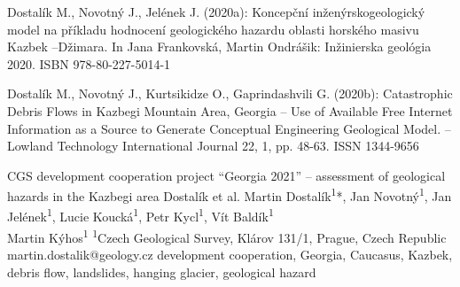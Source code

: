 {Dostalík M., Novotný J., Jelének J. (2020a): Koncepční inženýrskogeologický model na příkladu hodnocení geologického hazardu oblasti horského masivu Kazbek –Džimara. In Jana Frankovská, Martin Ondrášik: Inžinierska geológia 2020. ISBN 978-80-227-5014-1

Dostalík M., Novotný J., Kurtsikidze O., Gaprindashvili G. (2020b): Catastrophic Debris Flows in Kazbegi Mountain Area, Georgia – Use of Available Free Internet Information as a Source to Generate Conceptual Engineering Geological Model. – Lowland Technology International Journal 22, 1, pp. 48-63. ISSN 1344-9656
}


\abstract
{CGS development cooperation project \enquote{Georgia 2021} -- assessment of geological hazards in the Kazbegi area} 
{Dostalík et al.} 
{Martin Dostalík\textsuperscript{1}*, Jan Novotný\textsuperscript{1}, Jan Jelének\textsuperscript{1}, Lucie Koucká\textsuperscript{1}, Petr Kycl\textsuperscript{1}, Vít Baldík\textsuperscript{1}\\ Martin Kýhos\textsuperscript{1}} 
{\POtag} 
{
\textsuperscript{1}Czech Geological Survey, Klárov 131/1, Prague, Czech Republic
}
{martin.dostalik@geology.cz}  %
{development cooperation, Georgia, Caucasus, Kazbek, debris flow, landslides, hanging glacier, geological hazard}
